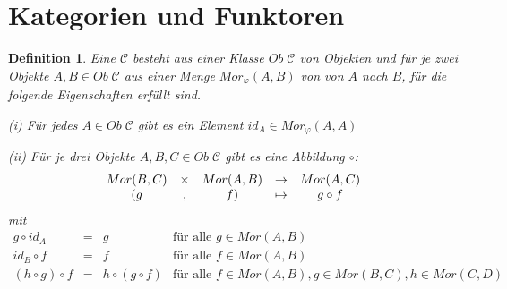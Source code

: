 \documentclass[a4paper,10pt,german]{scrbook}
\theoremstyle{saetze}
\theoremstyle{definitionen}
\newtheorem{Def}{Definition}[section]
\begin{document}
\section{Kategorien und Funktoren}


\begin{Def}
    Eine  $\mathcal{C}$ besteht aus einer Klasse $Ob
    \;\mathcal{C}$ von Objekten und für je zwei Objekte $A,B \in Ob\; \mathcal{C}$ aus 
    einer Menge $Mor_{\varphi}(A,B)$ von  von $A$ nach $B$, für
    die folgende Eigenschaften erfüllt sind.
    
    \begin{enum}
        \item[(i)] Für jedes $A \in Ob\; \mathcal{C}$ gibt es ein Element $id_A
        \in Mor_{\varphi}(A,A)$

        \item[(ii)] Für je drei Objekte $A,B,C \in Ob\;\mathcal{C}$ gibt es eine Abbildung
        $\circ$:
        \[\begin{array}{ccccc} Mor(B,C) & \times & Mor(A,B) & \rightarrow & Mor(A,C) \\
        (g  &,& f)  & \mapsto & g \circ f \end{array}\] mit 
        \[\begin{array}{cccc} g \circ id_A & = & g & \mbox{für alle } g \in
        Mor(A,B) \\ id_B \circ f &=& f & \mbox{für alle } f \in Mor(A,B) \\ (h
        \circ g)\circ f & = & h\circ(g\circ f) & \mbox{für alle } f \in
        Mor(A,B), g \in Mor(B,C), h \in Mor(C,D)\end{array}\]
\end{enum}


\end{Def}
\end{document}
